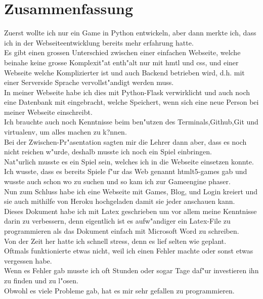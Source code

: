 \documentclass{article}
\begin{document}
\section{Zusammenfassung}
Zuerst wollte ich nur ein Game in Python entwickeln, aber dann merkte ich,
dass ich in der Webseiteentwicklung bereits mehr erfahrung hatte.\\
Es gibt einen grossen Unterschied zwischen einer einfachen Webseite,
welche beinahe keine grosse Komplexit"at enth"alt nur mit hmtl und css, und einer Webseite welche Komplizierter ist und auch
Backend betrieben wird, d.h. mit einer Serverside Sprache vervollst"andigt werden muss.\\
In meiner Webseite habe ich dies mit Python-Flask verwirklicht und auch noch eine
Datenbank mit eingebracht, welche Speichert, wenn sich eine neue Person bei meiner
Webseite einschreibt.\\
Ich brauchte auch noch Kenntnisse beim ben"utzen des Terminals,Github,Git und virtualenv, um
alles machen zu k?nnen.\\
Bei der Zwischen-Pr"asentation sagten mir die Lehrer dann aber,
dass es noch nicht reichen w"urde, deshalb musste ich noch ein Spiel einbringen.\\
Nat"urlich musste es ein Spiel sein, welches ich in die Webseite einsetzen konnte.\\
Ich wusste, dass es bereits Spiele f"ur das Web genannt htmlt5-games gab und wusste
auch schon wo zu suchen und so kam ich zur Gameengine phaser.\\
Nun zum Schluss habe ich eine Webseite mit Games, Blog, und Login kreiert
und sie auch mithilfe von Heroku hochgeladen damit sie jeder anschauen kann.\\
Dieses Dokument habe ich mit Latex geschrieben um vor allem meine Kenntnisse darin zu
verbessern, denn eigentlich ist es aufw"andiger ein Latex-File zu programmieren als das Dokument
einfach mit Microsoft Word zu schreiben.\\
Von der Zeit her hatte ich schnell stress, denn es lief selten wie geplant.\\
Oftmals funktionierte etwas nicht, weil ich einen Fehler machte oder sonst etwas vergessen habe.\\
Wenn es Fehler gab musste ich oft Stunden oder sogar Tage daf"ur investieren ihn zu finden und zu l"osen.\\
Obwohl es viele Probleme gab, hat es mir sehr gefallen zu programmieren.


\cleardoublepage
\end{document}
